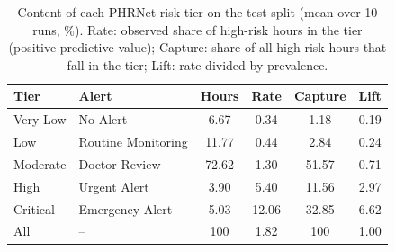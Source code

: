 \begin{table}[t]
\centering
\caption{Content of each PHRNet risk tier on the test split (mean over 10 runs, \%). Rate: observed share of high-risk hours in the tier (positive predictive value); Capture: share of all high-risk hours that fall in the tier; Lift: rate divided by prevalence.}
\label{tab:tiers_content}
\footnotesize
\setlength{\tabcolsep}{3pt}
\begin{tabular}{llcccc}
\toprule
\textbf{Tier} & \textbf{Alert} & \textbf{Hours} & \textbf{Rate} & \textbf{Capture} & \textbf{Lift} \\
\midrule
Very Low & No Alert & 6.67 & 0.34 & 1.18 & 0.19 \\
Low & Routine Monitoring & 11.77 & 0.44 & 2.84 & 0.24 \\
Moderate & Doctor Review & 72.62 & 1.30 & 51.57 & 0.71 \\
High & Urgent Alert & 3.90 & 5.40 & 11.56 & 2.97 \\
Critical & Emergency Alert & 5.03 & 12.06 & 32.85 & 6.62 \\
\midrule
All & -- & 100 & 1.82 & 100 & 1.00 \\
\bottomrule
\end{tabular}
\end{table}